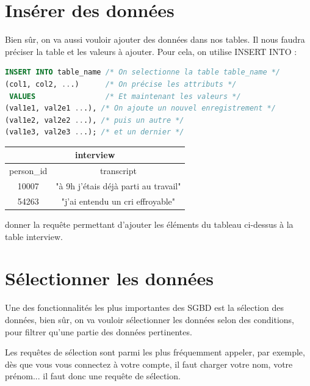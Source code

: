 \vfill

\section{Insérer des données}
Bien sûr, on va aussi vouloir ajouter des données dans nos tables.
Il nous faudra préciser la table et les valeurs à ajouter.
Pour cela, on utilise INSERT INTO :
\begin{lstlisting}[style=SQLstyle, language=SQL]
INSERT INTO table_name /* On selectionne la table table_name */
(col1, col2, ...)      /* On précise les attributs */
 VALUES                /* Et maintenant les valeurs */
(val1e1, val2e1 ...), /* On ajoute un nouvel enregistrement */
(val1e2, val2e2 ...), /* puis un autre */
(val1e3, val2e3 ...); /* et un dernier */
\end{lstlisting}

\vfill

\begin{Exercise}
    \begin{center}\begin{tabular}{|c c|}
    \hline
    \multicolumn{2}{|c|}{\textbf{interview}} \\
    \hline
        person\_id & transcript \\
        \hline
        \hline
        10007	& "à 9h j'étais déjà parti au travail" \\
        54263 & "j'ai entendu un cri effroyable"  \\
    \hline
    \end{tabular}
    \end{center}
    
    \Question donner la requête permettant d'ajouter les éléments du tableau ci-dessus à la table interview.\\    

    \emptybox{5cm}
\end{Exercise} 

\newpage

\section{Sélectionner les données}
Une des fonctionnalités les plus importantes des SGBD est la sélection des données, bien sûr, on va vouloir sélectionner les données selon des conditions, pour filtrer qu'une partie des données pertinentes.

Les requêtes de sélection sont parmi les plus fréquemment appeler, par exemple, dès que vous vous connectez à votre compte, il faut charger votre nom, votre prénom... il faut donc une requête de sélection.

